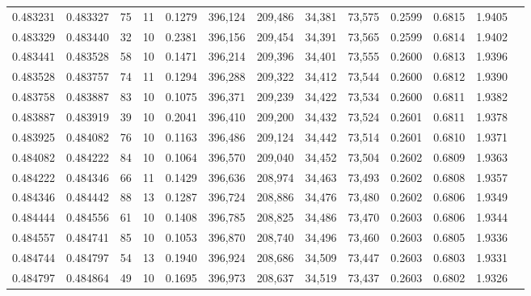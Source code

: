 \begin{tabular}{rrrrrrrrrrrrr}
0.483231 & 0.483327 &    75 &  11 &                                     0.1279 & 396,124 & 209,486 &  34,381 &  73,575 & 0.2599 & 0.6815 & 1.9405 \\
0.483329 & 0.483440 &    32 &  10 &                                     0.2381 & 396,156 & 209,454 &  34,391 &  73,565 & 0.2599 & 0.6814 & 1.9402 \\
0.483441 & 0.483528 &    58 &  10 &                                     0.1471 & 396,214 & 209,396 &  34,401 &  73,555 & 0.2600 & 0.6813 & 1.9396 \\
0.483528 & 0.483757 &    74 &  11 &                                     0.1294 & 396,288 & 209,322 &  34,412 &  73,544 & 0.2600 & 0.6812 & 1.9390 \\
0.483758 & 0.483887 &    83 &  10 &                                     0.1075 & 396,371 & 209,239 &  34,422 &  73,534 & 0.2600 & 0.6811 & 1.9382 \\
0.483887 & 0.483919 &    39 &  10 &                                     0.2041 & 396,410 & 209,200 &  34,432 &  73,524 & 0.2601 & 0.6811 & 1.9378 \\
0.483925 & 0.484082 &    76 &  10 &                                     0.1163 & 396,486 & 209,124 &  34,442 &  73,514 & 0.2601 & 0.6810 & 1.9371 \\
0.484082 & 0.484222 &    84 &  10 &                                     0.1064 & 396,570 & 209,040 &  34,452 &  73,504 & 0.2602 & 0.6809 & 1.9363 \\
0.484222 & 0.484346 &    66 &  11 &                                     0.1429 & 396,636 & 208,974 &  34,463 &  73,493 & 0.2602 & 0.6808 & 1.9357 \\
0.484346 & 0.484442 &    88 &  13 &                                     0.1287 & 396,724 & 208,886 &  34,476 &  73,480 & 0.2602 & 0.6806 & 1.9349 \\
0.484444 & 0.484556 &    61 &  10 &                                     0.1408 & 396,785 & 208,825 &  34,486 &  73,470 & 0.2603 & 0.6806 & 1.9344 \\
0.484557 & 0.484741 &    85 &  10 &                                     0.1053 & 396,870 & 208,740 &  34,496 &  73,460 & 0.2603 & 0.6805 & 1.9336 \\
0.484744 & 0.484797 &    54 &  13 &                                     0.1940 & 396,924 & 208,686 &  34,509 &  73,447 & 0.2603 & 0.6803 & 1.9331 \\
0.484797 & 0.484864 &    49 &  10 &                                     0.1695 & 396,973 & 208,637 &  34,519 &  73,437 & 0.2603 & 0.6802 & 1.9326 \\

\end{tabular}
